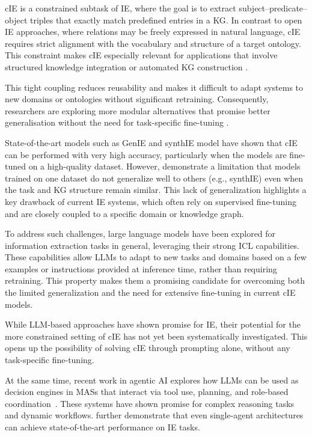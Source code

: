 \documentclass[a4paper,oneside,bibliography=totoc]{scrbook}
\begin{document}
\Ac{cIE} is a constrained subtask of \ac{IE}, where the goal is to extract subject–predicate–object triples that exactly match predefined entries in a \ac{KG}. In contrast to open \ac{IE} approaches, where relations may be freely expressed in natural language, \ac{cIE} requires strict alignment with the vocabulary and structure of a target ontology. This constraint makes \ac{cIE} especially relevant for applications that involve structured knowledge integration or automated \ac{KG} construction \cite{Josifoski2021}.

This tight coupling reduces reusability and makes it difficult to adapt systems to new domains or ontologies without significant retraining. Consequently, researchers are exploring more modular alternatives that promise better generalisation without the need for task-specific fine-tuning \cite{Shi2024}.

State-of-the-art models such as GenIE and synthIE model have shown that \ac{cIE} can be performed with very high accuracy, particularly when the models are fine-tuned on a high-quality dataset. However, \cite{Josifoski2021,Josifoski2023} demonstrate a limitation that models trained on one dataset do not generalize well to others (e.g., synthIE) even when the task and \ac{KG} structure remain similar. This lack of generalization highlights a key drawback of current \ac{IE} systems, which often rely on supervised fine-tuning and are closely coupled to a specific domain or knowledge graph.

To address such challenges, large language models have been explored for information extraction tasks in general, leveraging their strong \ac{ICL} capabilities. These capabilities allow \acp{LLM} to adapt to new tasks and domains based on a few examples or instructions provided at inference time, rather than requiring retraining. This property makes them a promising candidate for overcoming both the limited generalization and the need for extensive fine-tuning in current \ac{cIE} models.

While LLM-based approaches have shown promise for \ac{IE}, their potential for the more constrained setting of \ac{cIE} has not yet been systematically investigated. This opens up the possibility of solving \ac{cIE} through prompting alone, without any task-specific fine-tuning.

At the same time, recent work in agentic AI explores how \acp{LLM} can be used as decision engines in \acp{MAS} that interact via tool use, planning, and role-based coordination~\cite{OpenAI2025,Anthropic2024,Wiesinger2025}. These systems have shown promise for complex reasoning tasks and dynamic workflows. \citet{Shi2024} further demonstrate that even single-agent architectures can achieve state-of-the-art performance on \ac{IE} tasks.
\end{document}
